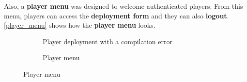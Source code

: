 \documentclass[a4paper,11pt,titlepage,abstract,numbers=noenddot,automark,mnsy,intlimits,rgb,dvipsnames]{report}
\begin{document}
Also, a \textbf{player menu} was designed to welcome authenticated players. From this menu, players can access the \textbf{deployment form}
and they can also \textbf{logout}. \autoref{player_menu} shows how the \textbf{player menu} looks.
\begin{figure}[H]
\begin{minipage}{.5\textwidth}
\begin{figure}[H]
\caption{Player deployment with a compilation error}
\label{deploy_error}
\end{figure}
\end{minipage}
\begin{minipage}{.5\textwidth}
\begin{figure}[H]
\caption{Player menu}
\label{player_menu}
\end{figure}
\end{minipage}
\end{figure}
\end{document}
